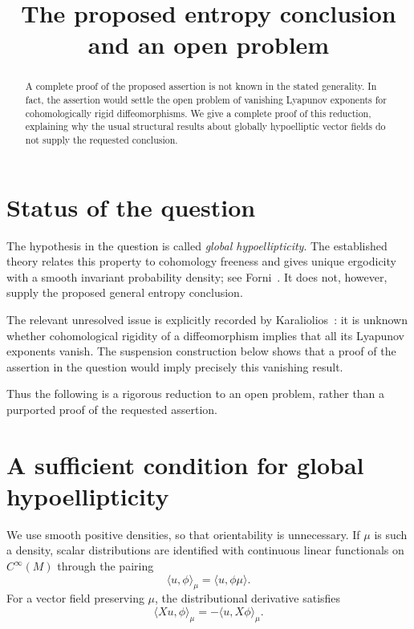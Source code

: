 \documentclass[11pt]{article}
\title{The proposed entropy conclusion and an open problem}
\author{}
\date{}
\theoremstyle{definition}
\theoremstyle{remark}
\begin{document}
\maketitle

\begin{abstract}
A complete proof of the proposed assertion is not known in the stated
generality. In fact, the assertion would settle the open problem of
vanishing Lyapunov exponents for cohomologically rigid diffeomorphisms.
We give a complete proof of this reduction, explaining why the usual
structural results about globally hypoelliptic vector fields do not
supply the requested conclusion.
\end{abstract}

\section{Status of the question}

The hypothesis in the question is called \emph{global hypoellipticity}.
The established theory relates this property to cohomology freeness and
gives unique ergodicity with a smooth invariant probability density;
see Forni~\cite[Proposition~2.4 and Theorem~3.10]{Forni}.
It does not, however, supply the proposed general entropy conclusion.

The relevant unresolved issue is explicitly recorded by
Karaliolios~\cite[Introduction, p.~6]{Karaliolios}: it is unknown whether
cohomological rigidity of a diffeomorphism implies that all its Lyapunov
exponents vanish. The suspension construction below shows that a proof
of the assertion in the question would imply precisely this vanishing
result.

Thus the following is a rigorous reduction to an open problem, rather
than a purported proof of the requested assertion.

\section{A sufficient condition for global hypoellipticity}

We use smooth positive densities, so that orientability is unnecessary.
If $\mu$ is such a density, scalar distributions are identified with
continuous linear functionals on $C^\infty(M)$ through the pairing
\[
 \langle u,\phi\rangle_\mu
 =
 \langle u,\phi\mu\rangle.
\]
For a vector field preserving $\mu$, the distributional derivative
satisfies
\[
 \langle Xu,\phi\rangle_\mu
 =
 -\langle u,X\phi\rangle_\mu.
\]
\end{document}
